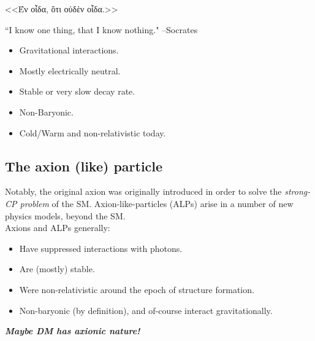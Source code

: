 \documentclass[10pt,utf8,compress,xcolor=dvipsnames]{beamer}
\begin{document}
\begin{frame}{\insertsubsectionhead}
	\begin{center}
		\begin{otherlanguage}{greek}
			<<Έν οἶδα, ὅτι οὐδὲν οἶδα.>>\\
		\end{otherlanguage}		
		``I know one thing,  that I know nothing."
		\flushright --Socrates %
	\end{center}
	
	\begin{itemize}
		\item Gravitational interactions.
		\item Mostly electrically neutral.
		\item Stable or very slow decay rate. 
		\item Non-Baryonic.
		\item Cold/Warm and non-relativistic today.
	\end{itemize}
	
\end{frame}

\subsection{The axion (like) particle}
\begin{frame}{\insertsubsectionhead}
	Notably, the original axion was originally introduced in order to solve the {\em strong-CP problem} of the SM.
	Axion-like-particles (ALPs) arise in a number of new physics models, beyond the SM.  \\[0.5cm]
	
	Axions and ALPs generally:
	\begin{itemize}
		\item Have suppressed interactions with photons.
		\item Are (mostly) stable. 
		\item Were non-relativistic around the epoch of structure formation. 
		\item Non-baryonic (by definition), and of-course interact gravitationally.\pause\\[1cm]
	\end{itemize}
	
	\begin{center}
		{\bf \em Maybe DM has axionic nature!}	
	\end{center}
	
\end{frame}
\end{document}
